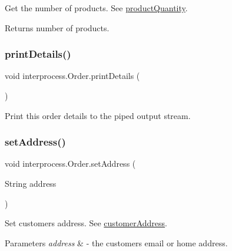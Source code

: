 Get the number of products. See \hyperlink{classinterprocess_1_1_order_a471467d213a750ba99fc21e9d468fe98}{product\+Quantity}. \begin{DoxyReturn}{Returns}
number of products. 
\end{DoxyReturn}
\mbox{\label{classinterprocess_1_1_order_a780af8945598d5b31d124e0309c4ae65}} 
\subsubsection{\texorpdfstring{print\+Details()}{printDetails()}}
{\footnotesize\ttfamily void interprocess.\+Order.\+print\+Details (\begin{DoxyParamCaption}{ }\end{DoxyParamCaption})\hspace{0.3cm}{\ttfamily [inline]}}

Print this order details to the piped output stream. \mbox{\label{classinterprocess_1_1_order_a0264f8cb97eb1a9e0bc445b2ea3a6b55}} 
\subsubsection{\texorpdfstring{set\+Address()}{setAddress()}}
{\footnotesize\ttfamily void interprocess.\+Order.\+set\+Address (\begin{DoxyParamCaption}\item[{String}]{address }\end{DoxyParamCaption})\hspace{0.3cm}{\ttfamily [inline]}}

Set customer\textquotesingle{}s address. See \hyperlink{classinterprocess_1_1_order_a681c40b962e58237454c9feaae2610d9}{customer\+Address}. 
\begin{DoxyParams}{Parameters}
{\em address} & -\/ the customer\textquotesingle{}s email or home address. \\
\hline
\end{DoxyParams}
\mbox{\label{classinterprocess_1_1_order_a175bac96d567d6fe6cc7829275f58451}} 
